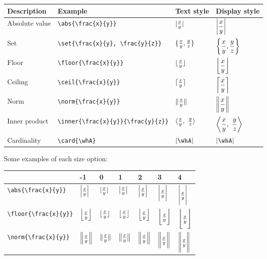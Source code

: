 \documentclass{article}
\begin{document}
\begin{center}
\begin{tabular}{@{}llll@{}}
\toprule
Description				& Example 					& Text style 				& Display style \\ \midrule
Absolute value 			& \verb!\abs{\frac{x}{y}}!        	& $\abs{\frac{x}{y}}$ 		& $\displaystyle\abs{\frac{x}{y}}$ \\[10pt]
Set 					& \verb!\set{\frac{x}{y}, \frac{y}{z}}!        & $\set{\frac{x}{y}, \frac{y}{z}}$ 	& $\displaystyle\set{\frac{x}{y}, \frac{y}{z}}$ \\[10pt]
Floor					& \verb!\floor{\frac{x}{y}}!        	& $\floor{\frac{x}{y}}$ 		& $\displaystyle\floor{\frac{x}{y}}$ \\[10pt]
Ceiling 				& \verb!\ceil{\frac{x}{y}}!        	& $\ceil{\frac{x}{y}}$ 		& $\displaystyle\ceil{\frac{x}{y}}$ \\[10pt]
Norm					& \verb!\norm{\frac{x}{y}}!       	& $\norm{\frac{x}{y}}$ 	& $\displaystyle\norm{\frac{x}{y}}$ \\[10pt]
Inner product			& \verb!\inner{\frac{x}{y}}{\frac{y}{z}}!       	& $\inner{\frac{x}{y}}{\frac{y}{z}}$ 	& $\displaystyle\inner{\frac{x}{y}}{\frac{y}{z}}$ \\[10pt]
Cardinality 				& \verb!\card{\whA}!       		& $\card{\whA}$ 			& $\displaystyle\card{\whA}$ \\[10pt]
\bottomrule
\end{tabular}
\end{center}

Some examples of each size option:
\begin{center}
\begin{tabular}{@{}lllllll@{}}
\toprule
					& -1 					& 0					& 1					& 2					& 3					& 4 \\ \midrule

\verb!\abs{\frac{x}{y}}!        	& $\abs[-1]{\frac{x}{y}}$ 	& $\abs[0]{\frac{x}{y}}$ 	& $\abs[1]{\frac{x}{y}}$ 	& $\abs[2]{\frac{x}{y}}$ 	& $\abs[3]{\frac{x}{y}}$ 	& $\abs[4]{\frac{x}{y}}$ \\[10pt]
\verb!\floor{\frac{x}{y}}!        	& $\floor[-1]{\frac{x}{y}}$	& $\floor[0]{\frac{x}{y}}$	& $\floor[1]{\frac{x}{y}}$	& $\floor[2]{\frac{x}{y}}$	& $\floor[3]{\frac{x}{y}}$	& $\floor[4]{\frac{x}{y}}$ \\[10pt]
\verb!\norm{\frac{x}{y}}!       	& $\norm[-1]{\frac{x}{y}}$	& $\norm[0]{\frac{x}{y}}$	& $\norm[1]{\frac{x}{y}}$	& $\norm[2]{\frac{x}{y}}$	& $\norm[3]{\frac{x}{y}}$	& $\norm[4]{\frac{x}{y}}$ \\[10pt]
\bottomrule
\end{tabular}
\end{center}
\end{document}
